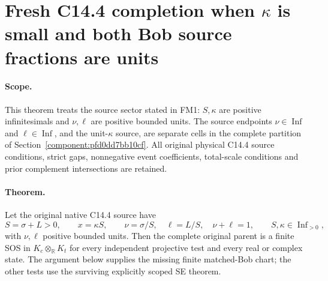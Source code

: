 \section{\texorpdfstring{Fresh C14.4 completion when $\kappa$ is small and both Bob source fractions are units}{Fresh C14.4 completion when kappa is small and both Bob source fractions are units}}
\label{component:p2edb55cd1f69}

\label{p2edb55cd1f69:sec:new-c144-finite-matched}

\paragraph{Scope.}
This theorem treats the source sector stated in FM1: $S,\kappa$ are positive infinitesimals and $\nu,\ell$ are positive bounded units. The source endpoints $\nu\in\operatorname{Inf}$ and $\ell\in\operatorname{Inf}$, and the unit-$\kappa$ source, are separate cells in the complete partition of Section~\ref{component:pfd0dd7bb10cf}. All original physical C14.4 source conditions, strict gaps, nonnegative event coefficients, total-scale conditions and prior complement intersections are retained.

\paragraph{Theorem.}
Let the original native C14.4 source have
\[
 S=\sigma+L>0,\qquad x=\kappa S,\qquad
 \nu=\sigma/S,\quad\ell=L/S,\quad\nu+\ell=1,
 \qquad S,\kappa\in\operatorname{Inf}_{>0},
 \tag{FM1}
\]
with $\nu,\ell$ positive bounded units. Then the complete original
parent is a finite SOS in $K_c\otimes_{\mathbb R}K_t$ for every
independent projective test and every real or complex state.
The argument below supplies the missing finite matched-Bob chart;
the other tests use the surviving explicitly scoped SE theorem.

